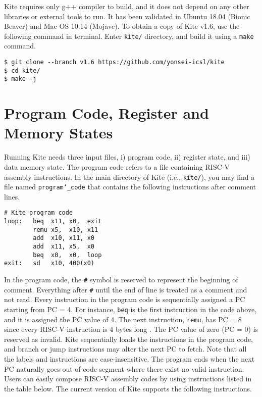 \documentclass[10pt]{article}
\begin{document}
Kite requires only g++ compiler to build, and it does not depend on any other libraries or external tools to run.
It has been validated in Ubuntu 18.04 (Bionic Beaver) and Mac OS 10.14 (Mojave).
To obtain a copy of Kite v1.6, use the following command in terminal.
Enter {\tt kite/} directory, and build it using a {\tt make} command.

\begin{Verbatim}[frame=single,fontsize=\small]
$ git clone --branch v1.6 https://github.com/yonsei-icsl/kite
$ cd kite/
$ make -j
\end{Verbatim}

\section{Program Code, Register and Memory States} \label{sec:inputs}
Running Kite needs three input files, i) program code, ii) register state, and iii) data memory state.
The program code refers to a file containing RISC-V assembly instructions.
In the main directory of Kite (i.e., {\tt kite/}), you may find a file named {\tt program\char`_code} that contains the following instructions after comment lines.

\begin{Verbatim}[frame=single,fontsize=\small]
# Kite program code
loop:   beq  x11, x0,  exit
        remu x5,  x10, x11
        add  x10, x11, x0
        add  x11, x5,  x0
        beq  x0,  x0,  loop
exit:   sd   x10, 400(x0)
\end{Verbatim}

In the program code, the {\tt \#} symbol is reserved to represent the beginning of comment.
Everything after {\tt \#} until the end of line is treated as a comment and not read.
Every instruction in the program code is sequentially assigned a PC starting from PC = 4.
For instance, {\tt beq} is the first instruction in the code above, and it is assigned the PC value of 4.
The next instruction, {\tt remu}, has PC = 8 since every RISC-V instruction is 4 bytes long \cite{waterman_riscv2019}.
The PC value of zero (PC = 0) is reserved as invalid.
Kite sequentially loads the instructions in the program code, and branch or jump instructions may alter the next PC to fetch.
Note that all the labels and instructions are case-insensitive.
The program ends when the next PC naturally goes out of code segment where there exist no valid instruction.
Users can easily compose RISC-V assembly codes by using instructions listed in the table below.
The current version of Kite supports the following instructions.
\end{document}
